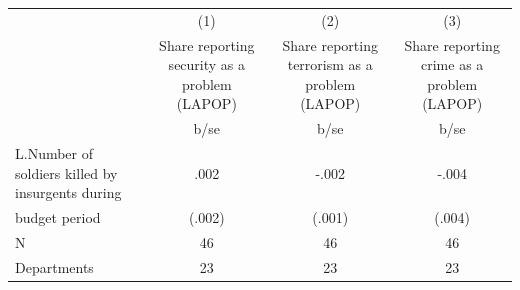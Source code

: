 {
\def\sym#1{\ifmmode^{#1}\else\(^{#1}\)\fi}
\begin{tabular}{l*{3}{c}}
\hline\hline
                                                  &\multicolumn{1}{c}{(1)}&\multicolumn{1}{c}{(2)}&\multicolumn{1}{c}{(3)}\\
                                                  &\multicolumn{1}{c}{Share reporting security as a problem (LAPOP)}&\multicolumn{1}{c}{Share reporting terrorism as a problem (LAPOP)}&\multicolumn{1}{c}{Share reporting crime as a problem (LAPOP)}\\
                                                  &        b/se   &        b/se   &        b/se   \\
\hline
L.Number of soldiers killed by insurgents during  &        .002   &       -.002   &       -.004   \\
budget period                                     &      (.002)   &      (.001)   &      (.004)   \\
\hline
N                                                 &          46   &          46   &          46   \\
Departments                                       &          23   &          23   &          23   \\
\hline\hline
\end{tabular}
}
